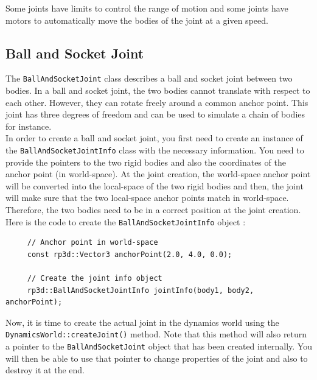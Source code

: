 \documentclass[a4paper,12pt]{article}
\begin{document}
    Some joints have limits to control the range of motion and some joints have motors to automatically move the bodies of the joint at a given speed. \\
    
    \subsection{Ball and Socket Joint}

    The \texttt{BallAndSocketJoint} class describes a ball and socket joint between two bodies. In a ball and socket joint, the two bodies cannot translate with respect to each other.
    However, they can rotate freely around a common anchor point. This joint has three degrees of freedom and can be used to simulate a chain of bodies for instance. \\

    In order to create a ball and socket joint, you first need to create an instance of the \texttt{BallAndSocketJointInfo} class with the necessary information. You need to provide the pointers to the
    two rigid bodies and also the coordinates of the anchor point (in world-space). At the joint creation, the world-space anchor point will be converted into the local-space of the two rigid
    bodies and then, the joint will make sure that the two local-space anchor points match in world-space. Therefore, the two bodies need to be in a correct position at the joint creation. \\

    Here is the code to create the \texttt{BallAndSocketJointInfo} object : \\

    \begin{lstlisting}
     // Anchor point in world-space
     const rp3d::Vector3 anchorPoint(2.0, 4.0, 0.0);

     // Create the joint info object
     rp3d::BallAndSocketJointInfo jointInfo(body1, body2, anchorPoint);
  \end{lstlisting}

    \vspace{0.6cm}

    Now, it is time to create the actual joint in the dynamics world using the \texttt{DynamicsWorld::createJoint()} method.
    Note that this method will also return a pointer to the \texttt{BallAndSocketJoint} object that has been created internally. You will then
    be able to use that pointer to change properties of the joint and also to destroy it at the end. \\
\end{document}
